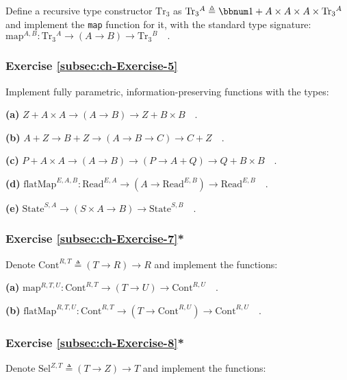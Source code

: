 Define a recursive type constructor $\text{Tr}_{3}$ as $\text{Tr}_{3}{}^{A}\triangleq\bbnum 1+A\times A\times A\times\text{Tr}_{3}{}^{A}$
and implement the \lstinline!map! function for it, with the standard
type signature: $\text{map}^{A,B}:\text{Tr}_{3}{}^{A}\rightarrow\left(A\rightarrow B\right)\rightarrow\text{Tr}_{3}{}^{B}\quad.$

\subsubsection{Exercise \label{subsec:ch-Exercise-5}\ref{subsec:ch-Exercise-5}}

Implement fully parametric, information-preserving functions with
the types:

\textbf{(a)} $Z+A\times A\rightarrow(A\rightarrow B)\rightarrow Z+B\times B\quad.$

\textbf{(b)} $A+Z\rightarrow B+Z\rightarrow(A\rightarrow B\rightarrow C)\rightarrow C+Z\quad.$

\textbf{(c)} $P+A\times A\rightarrow(A\rightarrow B)\rightarrow(P\rightarrow A+Q)\rightarrow Q+B\times B\quad.$

\textbf{(d)} $\text{flatMap}^{E,A,B}:\text{Read}^{E,A}\rightarrow(A\rightarrow\text{Read}^{E,B})\rightarrow\text{Read}^{E,B}\quad.$

\textbf{(e)} $\text{State}^{S,A}\rightarrow\left(S\times A\rightarrow B\right)\rightarrow\text{State}^{S,B}\quad.$

\subsubsection{Exercise \label{subsec:ch-Exercise-7}\ref{subsec:ch-Exercise-7}{*}}

Denote $\text{Cont}^{R,T}\triangleq\left(T\rightarrow R\right)\rightarrow R$
and implement the functions:

\textbf{(a)} $\text{map}^{R,T,U}:\text{Cont}^{R,T}\rightarrow(T\rightarrow U)\rightarrow\text{Cont}^{R,U}\quad.$

\textbf{(b)} $\text{flatMap}^{R,T,U}:\text{Cont}^{R,T}\rightarrow(T\rightarrow\text{Cont}^{R,U})\rightarrow\text{Cont}^{R,U}\quad.$

\subsubsection{Exercise \label{subsec:ch-Exercise-8}\ref{subsec:ch-Exercise-8}{*}}

Denote $\text{Sel}^{Z,T}\triangleq\left(T\rightarrow Z\right)\rightarrow T$
and implement the functions:

